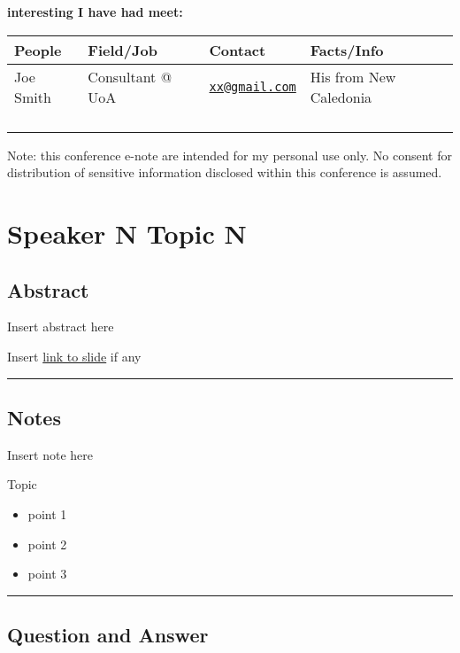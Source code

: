 \documentclass[
]{book}
\providecommand{\tightlist}{%
  \setlength{\itemsep}{0pt}\setlength{\parskip}{0pt}}
\begin{document}
\textbf{interesting I have had meet:}

\begin{longtable}[]{@{}llll@{}}
\toprule
People & Field/Job & Contact & Facts/Info\tabularnewline
\midrule
\endhead
Joe Smith & Consultant @ UoA & \href{mailto:xx@gmail.com}{\nolinkurl{xx@gmail.com}} & His from New Caledonia\tabularnewline
& & &\tabularnewline
& & &\tabularnewline
& & &\tabularnewline
& & &\tabularnewline
\bottomrule
\end{longtable}

Note: this conference e-note are intended for my personal use only. No consent for distribution of sensitive information disclosed within this conference is assumed.

\hypertarget{speaker-n-topic-n}{%
\chapter{Speaker N Topic N}\label{speaker-n-topic-n}}

\hypertarget{abstract}{%
\section*{Abstract}\label{abstract}}

Insert abstract here

Insert \href{}{link to slide} if any

\begin{center}\rule{0.5\linewidth}{0.5pt}\end{center}

\hypertarget{notes}{%
\section*{Notes}\label{notes}}

Insert note here

Topic

\begin{itemize}
\tightlist
\item
  point 1
\item
  point 2
\item
  point 3
\end{itemize}

\begin{center}\rule{0.5\linewidth}{0.5pt}\end{center}

\hypertarget{question-and-answer}{%
\section*{Question and Answer}\label{question-and-answer}}
\end{document}
